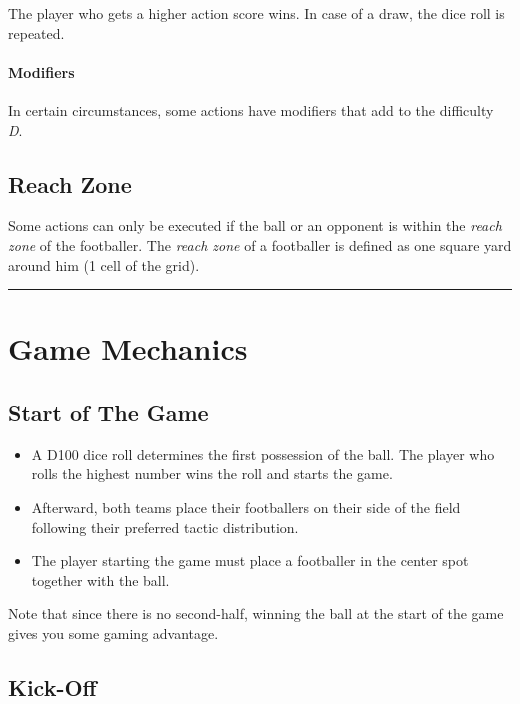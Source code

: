 \documentclass[12pt]{article}
\begin{document}
The player who gets a higher action score wins. In case of a draw, the dice roll is repeated.

\paragraph{Modifiers}

In certain circumstances, some actions have modifiers that add to the difficulty \emph{D}.

\subsection{Reach Zone}

Some actions can only be executed if the ball or an opponent is within the \emph{reach zone} of the footballer. The \emph{reach zone} of a footballer is defined as one square yard around him (1 cell of the grid).\bigskip\hrule\bigskip

\clearpage
\clearpage
\section{\textbf{Game Mechanics}}

\subsection{Start of The Game}

\begin{rulebox}
\begin{itemize}
\item A D100 dice roll determines the first possession of the ball. The player who rolls the highest number wins the roll and starts the game. 
\item Afterward, both teams place their footballers on their side of the field following their preferred tactic distribution. 
\item The player starting the game must place a footballer in the center spot together with the ball.
\end{itemize}
\end{rulebox}

\begin{note}
Note that since there is no second-half, winning the ball at the start of the game gives you some gaming advantage.
\end{note}

\subsection{Kick-Off}
\end{document}
